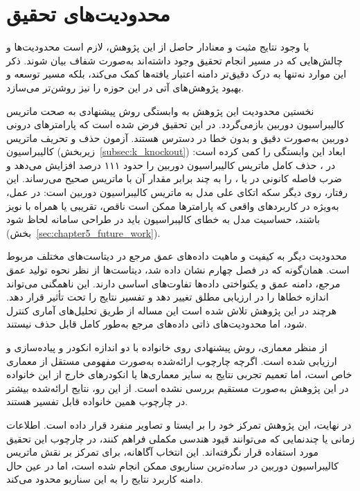 \section[محدودیت‌های تحقیق]{محدودیت‌های تحقیق}
\label{sec:chapter5_limitations}

با وجود نتایج مثبت و معنادار حاصل از این پژوهش،
لازم است محدودیت‌ها و چالش‌هایی که
در مسیر انجام تحقیق وجود داشته‌اند
به‌صورت شفاف بیان شوند.
ذکر این موارد نه‌تنها به درک دقیق‌تر
دامنه اعتبار یافته‌ها کمک می‌کند،
بلکه مسیر توسعه و بهبود پژوهش‌های آتی
در این حوزه را نیز روشن‌تر می‌سازد.

نخستین محدودیت این پژوهش
به وابستگی روش پیشنهادی به صحت
ماتریس کالیبراسیون دوربین بازمی‌گردد.
در این تحقیق فرض شده است که
پارامترهای درونی دوربین
به‌صورت دقیق و بدون خطا در دسترس هستند.
آزمون حذف و تحریف ماتریس کالیبراسیون (زیربخش~\ref{subsec:k_knockout})
ابعاد این وابستگی را کمی کرده است:
در \focaljitterconfig{}، حذف کامل ماتریس کالیبراسیون دوربین  را حدود ۱۱۱ درصد افزایش می‌دهد و ضرب فاصله کانونی در  یا ،  را به چند برابر مقدار آن با ماتریس صحیح می‌رساند.
این رفتار، روی دیگر سکه اتکای علی مدل به ماتریس کالیبراسیون دوربین است:
در عمل، به‌ویژه در کاربردهای واقعی که پارامترها ممکن است
ناقص، تقریبی یا همراه با نویز باشند،
حساسیت مدل به خطای کالیبراسیون باید در طراحی سامانه لحاظ شود
(بخش~\ref{sec:chapter5_future_work}).

محدودیت دیگر به کیفیت و ماهیت
داده‌های عمق مرجع در دیتاست‌های مختلف مربوط است.
همان‌گونه که در فصل چهارم نشان داده شد،
دیتاست‌ها از نظر نحوه تولید عمق مرجع،
دامنه عمق و یکنواختی داده‌ها
تفاوت‌های اساسی دارند.
این ناهمگنی می‌تواند
اندازه خطاها را در ارزیابی مطلق تغییر دهد
و تفسیر نتایج را تحت تأثیر قرار دهد.
هرچند در این پژوهش تلاش شده است
این مساله از طریق تحلیل‌های آماری
کنترل شود،
اما محدودیت‌های ذاتی داده‌های مرجع
به‌طور کامل قابل حذف نیستند.

از منظر معماری،
روش پیشنهادی روی خانواده  با دو اندازه انکودر  و 
پیاده‌سازی و ارزیابی شده است.
اگرچه چارچوب ارائه‌شده
به‌صورت مفهومی مستقل از معماری خاص است،
اما تعمیم تجربی نتایج به سایر معماری‌ها
یا انکودرهای خارج از این خانواده
در این پژوهش به‌صورت مستقیم بررسی نشده است.
از این رو،
نتایج ارائه‌شده
بیشتر در چارچوب همین خانواده
قابل تفسیر هستند.

در نهایت،
این پژوهش تمرکز خود را
بر  ایستا
و تصاویر منفرد قرار داده است.
اطلاعات زمانی یا چندنمایی
که می‌توانند قیود هندسی مکملی فراهم کنند،
در چارچوب این تحقیق مورد استفاده قرار نگرفته‌اند.
این انتخاب آگاهانه،
برای تمرکز بر نقش ماتریس کالیبراسیون دوربین
در ساده‌ترین سناریوی ممکن انجام شده است،
اما در عین حال دامنه کاربرد نتایج
را به این سناریو محدود می‌کند.

